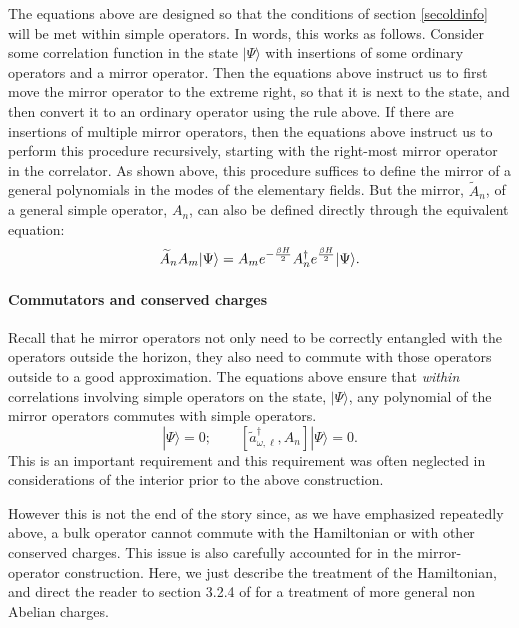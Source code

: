 \documentclass[12pt]{article}
\newcommand{\cop}[1]{#1}
\newcommand{\al}{\cop{A}} %
\def\ta{\widetilde{\cop{a}}}
\newcommand{\be}{\begin{equation}}
\newcommand{\ee}{\end{equation}}
\begin{document}
The equations above are designed so that the conditions of section \ref{secoldinfo} will be met within simple operators. In words, this works as follows. Consider some correlation function in the state $|\Psi \rangle$
with insertions of some ordinary operators and a mirror operator.  Then the equations above instruct us to first move the mirror operator to the extreme right, so that it is next to the state, and then convert it to an ordinary operator using the rule above. If there are insertions of multiple mirror operators, then the equations above instruct us to perform this procedure recursively, starting with the right-most mirror operator in the correlator. As shown above, this procedure suffices to define the mirror of a general polynomials in the modes of the elementary fields. But the mirror, $\widetilde{A}_n$, of a general simple operator, $A_n$, can also be defined directly through the equivalent equation:
\be
\label{generalmirror}
\widetilde{\al}_n \al_m |\Psi \rangle = \al_m e^{-{\beta H \over 2}} \al_n^{\dagger} e^{\beta H \over 2} |\Psi \rangle.
\ee

\paragraph{\bf Commutators and conserved charges \\}
Recall that he mirror operators not only need to be correctly entangled with the operators outside the horizon, they also need to  commute with those operators outside to a good approximation.  The equations above ensure that {\em within} correlations involving simple operators on the state, $|\Psi \rangle$,  any polynomial of the mirror operators commutes with simple operators.
\be
[\ta_{\omega, \ell}, \al_m] |\Psi \rangle = 0;  \qquad  [\ta_{\omega, \ell}^{\dagger}, \al_n] |\Psi \rangle = 0.
\ee
This is an important requirement and this requirement was often neglected in considerations of the interior prior to the above construction.


However this is not the end of the story since, as we have emphasized repeatedly above, a bulk operator cannot commute with the Hamiltonian or with other conserved charges. This issue is also carefully accounted for in the mirror-operator construction. Here, we just describe the treatment of the Hamiltonian, and direct the reader to section  3.2.4 of \cite{Papadodimas:2013jku} for a treatment of more general non Abelian charges.
\end{document}
